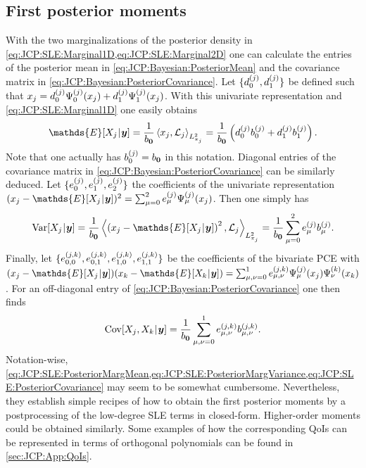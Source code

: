 \subsection{First posterior moments}
With the two marginalizations of the posterior density in \cref{eq:JCP:SLE:Marginal1D,eq:JCP:SLE:Marginal2D}
one can calculate the entries of the posterior mean in \cref{eq:JCP:Bayesian:PosteriorMean} and the covariance matrix in \cref{eq:JCP:Bayesian:PosteriorCovariance}.
Let \(\{d^{(j)}_0,d^{(j)}_1\}\) be defined such that \(x_j = d^{(j)}_{0} \Psi^{(j)}_{0}(x_j) + d^{(j)}_{1} \Psi^{(j)}_{1}(x_j)\).
With this univariate representation and \cref{eq:JCP:SLE:Marginal1D} one easily obtains
\begin{equation} \label{eq:JCP:SLE:PosteriorMargMean}
  \mathds{E}[X_j \cond \bm{y}]
  = \frac{1}{\coeffL_{\bm{0}}} \left\langle x_j, \mathcal{L}_j \right\rangle_{L_{\pi_j}^2}
  = \frac{1}{\coeffL_{\bm{0}}} \left( \coeffMu^{(j)}_{0} \coeffL^{(j)}_{0} + \coeffMu^{(j)}_{1} \coeffL^{(j)}_{1} \right).
\end{equation}
Note that one actually has \(b^{(j)}_{0} = b_{\bm{0}}\) in this notation.
Diagonal entries of the covariance matrix in \cref{eq:JCP:Bayesian:PosteriorCovariance} can be similarly deduced.
Let \(\{e_0^{(j)},e_1^{(j)},e_2^{(j)}\}\) the coefficients of the univariate representation
\((x_j - \mathds{E}[X_j \cond \bm{y}])^2 = \sum_{\mu=0}^2 \coeffVar^{(j)}_{\mu} \basis^{(j)}_{\mu}(x_j)\).
Then one simply has
\begin{equation} \label{eq:JCP:SLE:PosteriorMargVariance}
  \mathrm{Var}[X_j \cond \bm{y}]
  = \frac{1}{\coeffL_{\bm{0}}} \left\langle \left( x_j - \mathds{E}[X_j \cond \bm{y}] \right)^2, \mathcal{L}_j \right\rangle_{L_{\pi_j}^2}
  = \frac{1}{\coeffL_{\bm{0}}} \sum\limits_{\mu=0}^2 \coeffVar^{(j)}_{\mu} \coeffL^{(j)}_{\mu}.
\end{equation}
Finally, let \(\{e_{0,0}^{(j,k)},e_{0,1}^{(j,k)},e_{1,0}^{(j,k)},e_{1,1}^{(j,k)}\}\) be the coefficients of the bivariate PCE with
\((x_j - \mathds{E}[X_j \cond \bm{y}]) (x_k - \mathds{E}[X_k \cond \bm{y}]) = \sum_{\mu,\nu=0}^1 \coeffVar^{(j,k)}_{\mu,\nu} \basis^{(j)}_{\mu}(x_j) \basis^{(k)}_{\nu}(x_k)\).
For an off-diagonal entry of \cref{eq:JCP:Bayesian:PosteriorCovariance} one then finds
\begin{equation} \label{eq:JCP:SLE:PosteriorCovariance}
  \mathrm{Cov}[X_j,X_k {\:\!}|{\:\!} \bm{y}]
  = \frac{1}{b_{\bm{0}}} \sum\limits_{\mu,\nu=0}^1 e^{(j,k)}_{\mu,\nu} b^{(j,k)}_{\mu,\nu}.
\end{equation}
Notation-wise, \cref{eq:JCP:SLE:PosteriorMargMean,eq:JCP:SLE:PosteriorMargVariance,eq:JCP:SLE:PosteriorCovariance} may seem to be somewhat cumbersome.
Nevertheless, they establish simple recipes of how to obtain the first posterior moments by a postprocessing of the low-degree SLE terms in closed-form.
Higher-order moments could be obtained similarly.
Some examples of how the corresponding QoIs can be represented in terms of orthogonal polynomials can be found in \cref{sec:JCP:App:QoIs}.

